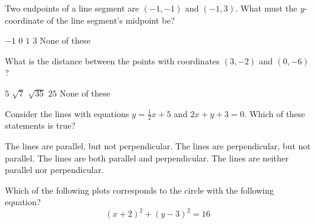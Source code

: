 \documentclass[12pt]{exam}
\newcommand{\<}{\langle}
\renewcommand{\>}{\rangle}
\begin{document}
\begin{questions}

\setcounter{question}{0}
\question[15]
Two endpoints of a line segment are \((-1,-1)\) and \((-1,3)\).
What must the \(y\)-coordinate of the line segment's midpoint be?


\begin{checkboxes}
\choice \(-1\)
\choice \(0\)
\choice \(1\)
\choice \(3\)
\choice None of these
\end{checkboxes}

\vfill

\question[15]
What is the distance between the points with coordinates \((3,-2)\)
and \((0,-6)\)?

\begin{checkboxes}
\choice \(5\)
\choice \(\sqrt{7}\)
\choice \(\sqrt{35}\)
\choice \(25\)
\choice None of these
\end{checkboxes}

\vfill

\question[15]
Consider the lines with equations \(y=\frac{1}{2}x+5\) and \(2x+y+3=0\).
Which of these statements is true?

\begin{checkboxes}
\choice The lines are parallel, but not perpendicular.
\choice The lines are perpendicular, but not parallel.
\choice The lines are both parallel and perpendicular.
\choice The lines are neither parallel nor perpendicular.
\end{checkboxes}

\vfill
\newpage

\question[15]
Which of the following plots corresponds to the circle with the following equation?
\[(x+2)^2+(y-3)^2=16\]

\begin{multicols}{2}
\begin{checkboxes}

  \choice


\end{checkboxes}
\end{multicols}
\end{questions}
\end{document}
